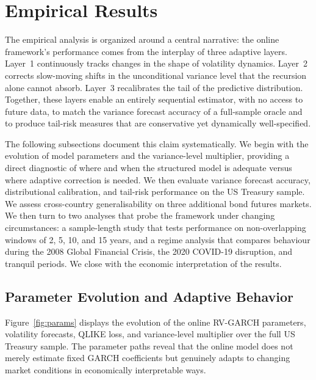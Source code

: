 \section{Empirical Results}\label{sec:results}

The empirical analysis is organized around a central narrative: the online framework's
performance comes from the interplay of three adaptive layers. Layer~1 continuously tracks
changes in the shape of volatility dynamics. Layer~2 corrects slow-moving shifts in the
unconditional variance level that the recursion alone cannot absorb. Layer~3 recalibrates the
tail of the predictive distribution. Together, these layers enable an entirely sequential
estimator, with no access to future data, to match the variance forecast accuracy of a
full-sample oracle and to produce tail-risk measures that are conservative yet dynamically
well-specified.

The following subsections document this claim systematically. We begin with the evolution of
model parameters and the variance-level multiplier, providing a direct diagnostic of where and
when the structured model is adequate versus where adaptive correction is needed. We then
evaluate variance forecast accuracy, distributional calibration, and tail-risk performance on
the US Treasury sample. We assess cross-country generalisability on three additional bond
futures markets. We then turn to two analyses that probe the framework under changing
circumstances: a sample-length study that tests performance on non-overlapping windows of 2,
5, 10, and 15 years, and a regime analysis that compares behaviour during the 2008 Global
Financial Crisis, the 2020 COVID-19 disruption, and tranquil periods.
We close with the economic interpretation of the results.

\subsection{Parameter Evolution and Adaptive Behavior}\label{sec:params}

Figure~\ref{fig:params} displays the evolution of the online RV-GARCH parameters, volatility
forecasts, QLIKE loss, and variance-level multiplier over the full US Treasury sample. The
parameter paths reveal that the online model does not merely estimate fixed GARCH coefficients
but genuinely adapts to changing market conditions in economically interpretable ways.

